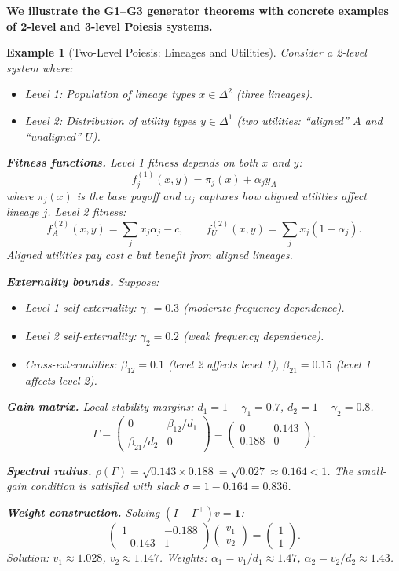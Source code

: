 \documentclass[12pt]{article}
\newtheorem{example}[theorem]{Example}
\newcommand{\added}[1]{\textbf{#1}}
\begin{document}
\added{\textbf{We illustrate the G1--G3 generator theorems with concrete examples of 2-level and 3-level Poiesis systems.}}

\begin{example}[Two-Level Poiesis: Lineages and Utilities]
\label{ex:two-level}
Consider a 2-level system where:
\begin{itemize}
    \item Level 1: Population of lineage types $x \in \Delta^2$ (three lineages).
    \item Level 2: Distribution of utility types $y \in \Delta^1$ (two utilities: ``aligned'' $A$ and ``unaligned'' $U$).
\end{itemize}

\textbf{Fitness functions.} Level 1 fitness depends on both $x$ and $y$:
\[
f^{(1)}_j(x, y) = \pi_j(x) + \alpha_j y_A
\]
where $\pi_j(x)$ is the base payoff and $\alpha_j$ captures how aligned utilities affect lineage $j$. Level 2 fitness:
\[
f^{(2)}_A(x, y) = \sum_j x_j \alpha_j - c, \qquad f^{(2)}_U(x, y) = \sum_j x_j (1 - \alpha_j).
\]
Aligned utilities pay cost $c$ but benefit from aligned lineages.

\textbf{Externality bounds.} Suppose:
\begin{itemize}
    \item Level 1 self-externality: $\gamma_1 = 0.3$ (moderate frequency dependence).
    \item Level 2 self-externality: $\gamma_2 = 0.2$ (weak frequency dependence).
    \item Cross-externalities: $\beta_{12} = 0.1$ (level 2 affects level 1), $\beta_{21} = 0.15$ (level 1 affects level 2).
\end{itemize}

\textbf{Gain matrix.} Local stability margins: $d_1 = 1 - \gamma_1 = 0.7$, $d_2 = 1 - \gamma_2 = 0.8$.
\[
\Gamma = \begin{pmatrix} 0 & \beta_{12}/d_1 \\ \beta_{21}/d_2 & 0 \end{pmatrix} = \begin{pmatrix} 0 & 0.143 \\ 0.188 & 0 \end{pmatrix}.
\]

\textbf{Spectral radius.} $\rho(\Gamma) = \sqrt{0.143 \times 0.188} = \sqrt{0.027} \approx 0.164 < 1$. The small-gain condition is satisfied with slack $\sigma = 1 - 0.164 = 0.836$.

\textbf{Weight construction.} Solving $(I - \Gamma^\top) v = \mathbf{1}$:
\[
\begin{pmatrix} 1 & -0.188 \\ -0.143 & 1 \end{pmatrix} \begin{pmatrix} v_1 \\ v_2 \end{pmatrix} = \begin{pmatrix} 1 \\ 1 \end{pmatrix}.
\]
Solution: $v_1 \approx 1.028$, $v_2 \approx 1.147$. Weights: $\alpha_1 = v_1/d_1 \approx 1.47$, $\alpha_2 = v_2/d_2 \approx 1.43$.


\end{example}
\end{document}
